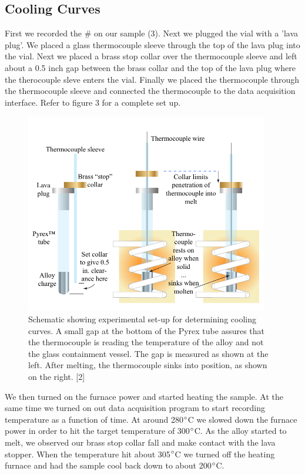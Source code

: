 \documentclass{article}
\begin{document}
\subsection{Cooling Curves}
First we recorded the \# on our sample (3). Next we plugged the vial with a 'lava plug'. We placed a glass thermocouple sleeve through the top of the lava plug into the vial. Next we placed a brass stop collar over the thermocouple sleeve and left about a 0.5 inch gap between the brass collar and the top of the lava plug where the therocouple sleve enters the vial. Finally we placed the thermocouple through the thermocouple sleeve and connected the thermocouple to the data acquisition interface. Refer to figure 3 for a complete set up.
\begin{figure}[H]
\centering
\includegraphics[width=300pt]{pics/diagram3.pdf}
\caption{Schematic showing experimental set-up for determining cooling curves. A small gap at the bottom of the Pyrex tube assures that the thermocouple is reading the temperature of the alloy and not the glass containment vessel. The gap is measured as shown at the left. After melting, the thermocouple sinks into position, as shown on the right. [2]}
\label{fig:diagram}
\end{figure}

We then turned on the furnace power and started heating the sample. At the same time we turned on out data acquisition program to start recording temperature as a function of time. At around 280$\degree$C we slowed down the furnace power in order to hit the target temperature of 300$\degree$C. As the alloy started to melt, we observed our brass stop collar fall and make contact with the lava stopper. When the temperature hit about 305$\degree$C we turned off the heating furnace and had the sample cool back down to about 200$\degree$C.
\end{document}
